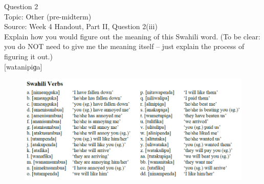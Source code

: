 \documentclass[12pt]{article}
\begin{document}
\newpage

{\large Question 2}\\

Topic: Other (pre-midterm)\\
Source: Week 4 Handout, Part II, Question 2(iii)\\

Explain how you would figure out the meaning of this Swahili word. (To be clear: you do NOT need to give me the meaning itself -- just explain the process of figuring it out.)\\

{[watanipiɡa]}

\begin{figure}[H]
\includegraphics{../images/swahiliverbs.png}
\end{figure}

\newpage

\begin{center}
\textbf{{\color{red}{\HUGE END OF EXAM}}}\\

\end{center}
\newpage
\end{document}
